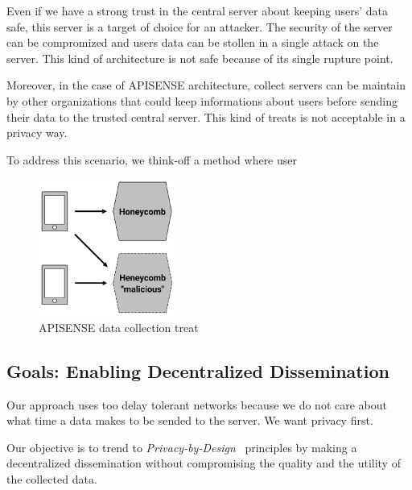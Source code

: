 Even if we have a strong trust in the central server about keeping users' data safe, this server is a target of choice for an attacker.
The security of the server can be compromized and users data can be stollen in a single attack on the server.
This kind of architecture is not safe because of its single rupture point.

Moreover, in the case of APISENSE architecture, collect servers can be maintain by other organizations that could keep informations about users before sending their data to the trusted central server.
This kind of treats is not acceptable in a privacy way.

To address this scenario, we think-off a method where user 

\begin{figure}[t]
	\centering
	\includegraphics[width=0.4\textwidth]{figures/honeycomb}
	\caption{\label{Honeycomb} APISENSE data collection treat}
\end{figure}

\subsection{Goals: Enabling Decentralized Dissemination}

Our approach uses too delay tolerant networks because we do not care about what time a data makes to be sended to the server. We want privacy first.

Our objective is to trend to \emph{Privacy-by-Design}~\cite{langheinrich2001privacy} principles by making a decentralized dissemination without compromising the quality and the utility of the collected data.
